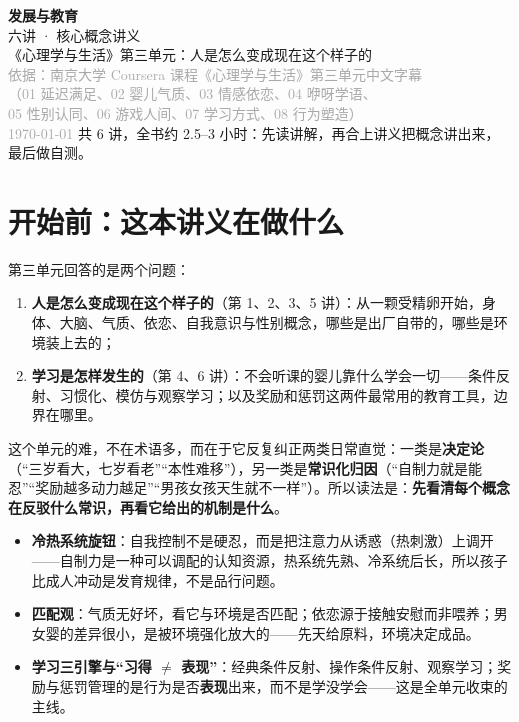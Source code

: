 \documentclass[UTF8,a4paper,11pt]{ctexart}
\begin{document}
\begin{center}
  \vspace*{2cm}
  {\Huge\bfseries\color{accent} 发展与教育}\\[0.4cm]
  {\LARGE 六讲 · 核心概念讲义}\\[1.2cm]
  {\large 《心理学与生活》第三单元：人是怎么变成现在这个样子的}\\[0.5cm]
  {\small\textcolor{darkgray}{依据：南京大学 Coursera 课程《心理学与生活》第三单元中文字幕\\（01 延迟满足、02 婴儿气质、03 情感依恋、04 咿呀学语、\\05 性别认同、06 游戏人间、07 学习方式、08 行为塑造）}}\\[0.3cm]
  {\small\textcolor{darkgray}{\today}}
  \vfill
  {\small 共 6 讲，全书约 2.5–3 小时：先读讲解，再合上讲义把概念讲出来，最后做自测。}
\end{center}
\newpage

\tableofcontents
\newpage

\section*{开始前：这本讲义在做什么}

第三单元回答的是两个问题：

\begin{enumerate}
  \item \textbf{人是怎么变成现在这个样子的}（第 1、2、3、5 讲）：从一颗受精卵开始，身体、大脑、气质、依恋、自我意识与性别概念，哪些是出厂自带的，哪些是环境装上去的；
  \item \textbf{学习是怎样发生的}（第 4、6 讲）：不会听课的婴儿靠什么学会一切——条件反射、习惯化、模仿与观察学习；以及奖励和惩罚这两件最常用的教育工具，边界在哪里。
\end{enumerate}

这个单元的难，不在术语多，而在于它反复纠正两类日常直觉：一类是\textbf{决定论}（“三岁看大，七岁看老”“本性难移”），另一类是\textbf{常识化归因}（“自制力就是能忍”“奖励越多动力越足”“男孩女孩天生就不一样”）。所以读法是：\textbf{先看清每个概念在反驳什么常识，再看它给出的机制是什么}。

\begin{keyconcept}[六讲要带走的三样工具]
\begin{itemize}
  \item \textbf{冷热系统旋钮}：自我控制不是硬忍，而是把注意力从诱惑（热刺激）上调开——自制力是一种可以调配的认知资源，热系统先熟、冷系统后长，所以孩子比成人冲动是发育规律，不是品行问题。
  \item \textbf{匹配观}：气质无好坏，看它与环境是否匹配；依恋源于接触安慰而非喂养；男女婴的差异很小，是被环境强化放大的——先天给原料，环境决定成品。
  \item \textbf{学习三引擎与“习得 $\neq$ 表现”}：经典条件反射、操作条件反射、观察学习；奖励与惩罚管理的是行为是否\textbf{表现}出来，而不是学没学会——这是全单元收束的主线。
\end{itemize}
\end{keyconcept}
\end{document}
